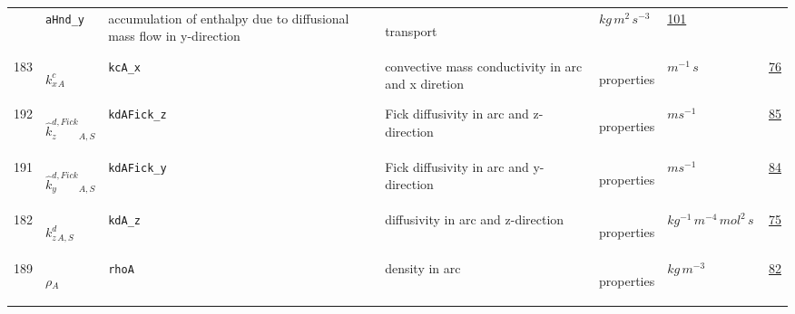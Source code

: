 \begin{longtable}{|p{1cm}|p{2.5cm}|p{4.5cm}|p{8cm}|p{3.0cm}|p{3cm}|p{1cm}|}
             & \verb|aHnd_y|
             & accumulation of enthalpy due to diffusional mass flow in y-direction
             & \begin{lay}transport \end{lay}
             & $ kg \,m^{2} \,s^{-3} \, $
             &                 \hyperlink{"e:101"}{ 101 }
                 \\
            183
             & \hypertarget{"v:183"}{ $ {{k^c_x}}{_{A}} $}
             & \verb|kcA_x|
             & convective mass conductivity in arc and x diretion
             & \begin{lay}properties \end{lay}
             & $ m^{-1} \,s \, $
             &                 \hyperlink{"e:76"}{ 76 }
                 \\
            192
             & \hypertarget{"v:192"}{ $ {{\hat{k}^{d,Fick}_z}}{_{A, S}} $}
             & \verb|kdAFick_z|
             & Fick diffusivity in arc and z-direction
             & \begin{lay}properties \end{lay}
             & $ m s^{-1} \, $
             &                 \hyperlink{"e:85"}{ 85 }
                 \\
            191
             & \hypertarget{"v:191"}{ $ {{\hat{k}^{d,Fick}_y}}{_{A, S}} $}
             & \verb|kdAFick_y|
             & Fick diffusivity in arc and y-direction
             & \begin{lay}properties \end{lay}
             & $ m s^{-1} \, $
             &                 \hyperlink{"e:84"}{ 84 }
                 \\
            182
             & \hypertarget{"v:182"}{ $ {{k^d_z}}{_{A, S}} $}
             & \verb|kdA_z|
             & diffusivity in arc and z-direction
             & \begin{lay}properties \end{lay}
             & $ kg^{-1} \,m^{-4} \,mol^{2} \,s \, $
             &                 \hyperlink{"e:75"}{ 75 }
                 \\
            189
             & \hypertarget{"v:189"}{ $ {{\rho}}{_{A}} $}
             & \verb|rhoA|
             & density in arc
             & \begin{lay}properties \end{lay}
             & $ kg \,m^{-3} \, $
             &                 \hyperlink{"e:82"}{ 82 }
                 \\

\end{longtable}
